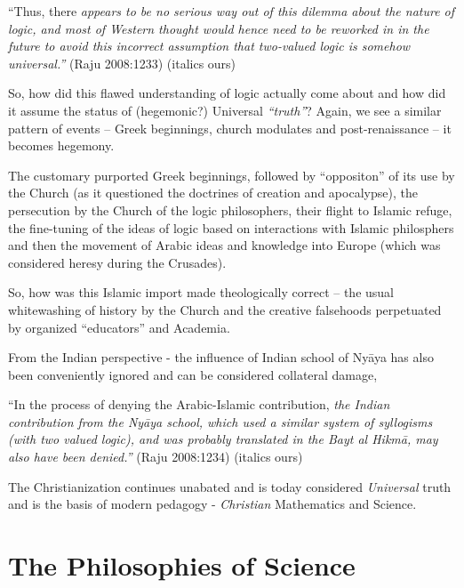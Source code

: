 \begin{myquote}
“Thus, there \textit{appears to be no serious way out of this dilemma about the nature of logic, and most of Western thought would hence need to be reworked in in the future to avoid this incorrect assumption that two-valued logic is somehow universal.”} \hfill (Raju 2008:1233) (italics ours)
\end{myquote}

So, how did this flawed understanding of logic actually come about and how did it assume the status of (hegemonic?) Universal \textit{“truth”}? Again, we see a similar pattern of events – Greek beginnings, church modulates and post-renaissance – it becomes hegemony.

The customary purported Greek beginnings, followed by “oppositon” of its use by the Church (as it questioned the doctrines of creation and apocalypse), the persecution by the Church of the logic philosophers, their flight to Islamic refuge, the fine-tuning of the ideas of logic based on interactions with Islamic philosphers and then the movement of Arabic ideas and knowledge into Europe (which was considered heresy during the Crusades).

So, how was this Islamic import made theologically correct – the usual whitewashing of history by the Church and the creative falsehoods perpetuated by organized “educators” and Academia.

From the Indian perspective - the influence of Indian school of Nyāya has also been conveniently ignored and can be considered collateral damage,

\begin{myquote}
“In the process of denying the Arabic-Islamic contribution, \textit{the Indian contribution from the Nyāya school, which used a similar system of syllogisms (with two valued logic), and was probably translated in the Bayt al Hikmā, may also have been denied.”} \hfill (Raju 2008:1234) (italics ours)
\end{myquote}

The Christianization continues unabated and is today considered \textit{Universal} truth and is the basis of modern pedagogy - \textit{Christian} Mathematics and Science.


\section*{The Philosophies of Science}

